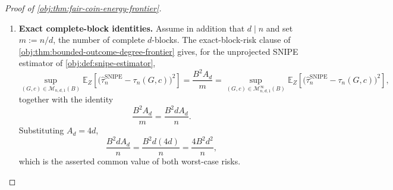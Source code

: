 \begin{proof}[Proof of \cref{obj:thm:fair-coin-energy-frontier}]
\begin{enumerate}
\item \textbf{Exact complete-block identities.}
Assume in addition that \(d\mid n\) and set \(m:=n/d\), the number of complete \(d\)-blocks.  The exact-block-risk clause of \cref{obj:thm:bounded-outcome-degree-frontier} gives, for the unprojected SNIPE estimator of \cref{obj:def:snipe-estimator},
\[
\sup_{(G,c)\in\mathcal M_{n,d,1}(B)}
\mathbb E_Z\!\left[\bigl(\widehat\tau_n^{\mathrm{SNIPE}}-\tau_n(G,c)\bigr)^2\right]
=
\frac{B^2A_d}{m}
=
\sup_{(G,c)\in\mathcal M_{n,d,1}^{\infty}(B)}
\mathbb E_Z\!\left[\bigl(\widehat\tau_n^{\mathrm{SNIPE}}-\tau_n(G,c)\bigr)^2\right],
\]
together with the identity
\[
\frac{B^2A_d}{m}
=
\frac{B^2dA_d}{n}.
\]
Substituting \(A_d=4d\),
\[
\frac{B^2dA_d}{n}
=
\frac{B^2d(4d)}{n}
=
\frac{4B^2d^2}{n},
\]
which is the asserted common value of both worst-case risks.
\end{enumerate}
\end{proof}
